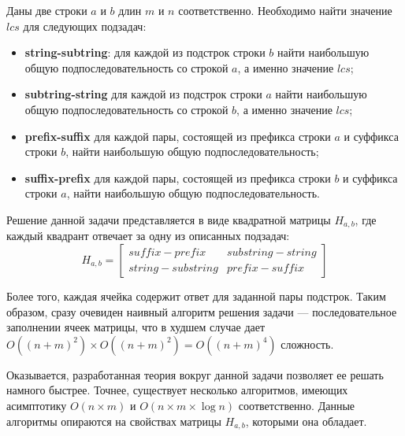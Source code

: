 Даны две строки $a$ и $b$ длин $m$ и $n$ соответственно. 
Необходимо найти значение $lcs$ для следующих подзадач:
\begin{itemize}
    \item \textbf{string-subtring}: для каждой из подстрок строки $b$ найти наибольшую общую подпоследовательность со строкой $a$, а именно значение $lcs$;
    \item \textbf{subtring-string} для каждой из подстрок строки $a$ найти наибольшую общую подпоследовательность со строкой $b$, а именно значение $lcs$;
    \item \textbf{prefix-suffix} для каждой пары, состоящей из префикса строки $a$ и суффикса строки $b$, найти наибольшую общую подпоследовательность;
    \item \textbf{suffix-prefix} для каждой пары, состоящей из префикса строки $b$ и суффикса строки $a$, найти наибольшую общую подпоследовательность.
\end{itemize}

Решение данной задачи представляется в виде квадратной матрицы $H_{a,b}$, где каждый квадрант отвечает за одну из описанных подзадач: 
\begin{equation}
 H_{a,b} = \begin{bmatrix}
suffix-prefix & substring-string \\
string-substring & prefix-suffix 
\end{bmatrix}    
\end{equation}

Более того, каждая ячейка содержит ответ для заданной пары подстрок.
Таким образом, сразу очевиден наивный алгоритм решения  задачи --- последовательное  заполнении ячеек матрицы, что в худшем случае дает $O((n+m)^2) \times O((n+m)^2) = O((n+ m)^4)  $ сложность.

Оказывается, разработанная теория вокруг  данной задачи позволяет ее решать намного быстрее.
Точнее, существует несколько алгоритмов, имеющих асимптотику $O(n \times m)$ и $O(n \times m \times \log n)$ соответственно.
Данные алгоритмы опираются на свойствах матрицы $H_{a,b}$, которыми она обладает.



